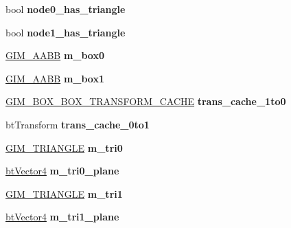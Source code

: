 \begin{DoxyCompactItemize}
\item 
\mbox{\label{classGIM__TREE__TREE__COLLIDER_a464a9c92f0463ae8b805614d18a82d2b}} 
bool {\bfseries node0\+\_\+has\+\_\+triangle}
\item 
\mbox{\label{classGIM__TREE__TREE__COLLIDER_a2f69330c2f46d86ac668507d479eb846}} 
bool {\bfseries node1\+\_\+has\+\_\+triangle}
\item 
\mbox{\label{classGIM__TREE__TREE__COLLIDER_ade3ced8be9de58b0a375bd8528bd7e05}} 
\hyperlink{classGIM__AABB}{G\+I\+M\+\_\+\+A\+A\+BB} {\bfseries m\+\_\+box0}
\item 
\mbox{\label{classGIM__TREE__TREE__COLLIDER_a36f9edc153cb2c5755f56fe5339488c4}} 
\hyperlink{classGIM__AABB}{G\+I\+M\+\_\+\+A\+A\+BB} {\bfseries m\+\_\+box1}
\item 
\mbox{\label{classGIM__TREE__TREE__COLLIDER_a719a32cf361143d6409fa51a103906b2}} 
\hyperlink{classGIM__BOX__BOX__TRANSFORM__CACHE}{G\+I\+M\+\_\+\+B\+O\+X\+\_\+\+B\+O\+X\+\_\+\+T\+R\+A\+N\+S\+F\+O\+R\+M\+\_\+\+C\+A\+C\+HE} {\bfseries trans\+\_\+cache\+\_\+1to0}
\item 
\mbox{\label{classGIM__TREE__TREE__COLLIDER_ad4828575c803930fcb7e45f0a93544ed}} 
bt\+Transform {\bfseries trans\+\_\+cache\+\_\+0to1}
\item 
\mbox{\label{classGIM__TREE__TREE__COLLIDER_a30631b6a514c21a94e70b0ecda065631}} 
\hyperlink{classGIM__TRIANGLE}{G\+I\+M\+\_\+\+T\+R\+I\+A\+N\+G\+LE} {\bfseries m\+\_\+tri0}
\item 
\mbox{\label{classGIM__TREE__TREE__COLLIDER_a0c43ea84d2829fd41636e79b120574f5}} 
\hyperlink{classbtVector4}{bt\+Vector4} {\bfseries m\+\_\+tri0\+\_\+plane}
\item 
\mbox{\label{classGIM__TREE__TREE__COLLIDER_ad661ac21a4ebc78694733689a95a31ce}} 
\hyperlink{classGIM__TRIANGLE}{G\+I\+M\+\_\+\+T\+R\+I\+A\+N\+G\+LE} {\bfseries m\+\_\+tri1}
\item 
\mbox{\label{classGIM__TREE__TREE__COLLIDER_a74a8e3c7109bc55b23c7be1a0744f6ee}} 
\hyperlink{classbtVector4}{bt\+Vector4} {\bfseries m\+\_\+tri1\+\_\+plane}
\end{DoxyCompactItemize}
